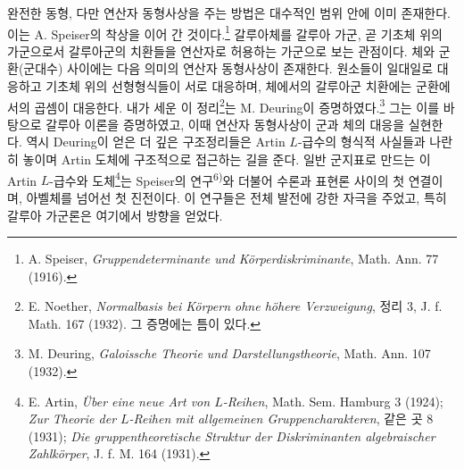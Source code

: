 완전한 동형, 다만 연산자 동형사상을 주는 방법은 대수적인 범위 안에 이미 존재한다. 이는 A. Speiser의 착상을 이어 간 것이다.\footnote{A. Speiser, \emph{Gruppendeterminante und Körperdiskriminante}, Math. Ann. 77 (1916).} 갈루아체를 \glqq{}갈루아 가군\grqq{}, 곧 기초체 위의 가군으로서 갈루아군의 치환들을 연산자로 허용하는 가군으로 보는 관점이다. 체와 군환(군대수) 사이에는 다음 의미의 연산자 동형사상이 존재한다. 원소들이 일대일로 대응하고 기초체 위의 선형형식들이 서로 대응하며, 체에서의 갈루아군 치환에는 군환에서의 곱셈이 대응한다. 내가 세운 이 정리\footnote{E. Noether, \emph{Normalbasis bei Körpern ohne höhere Verzweigung}, 정리 3, J. f. Math. 167 (1932). 그 증명에는 틈이 있다.}는 M. Deuring이 증명하였다.\footnote{M. Deuring, \emph{Galoissche Theorie und Darstellungstheorie}, Math. Ann. 107 (1932).} 그는 이를 바탕으로 갈루아 이론을 증명하였고, 이때 연산자 동형사상이 군과 체의 대응을 실현한다. 역시 Deuring이 얻은 더 깊은 구조정리들은 Artin \(L\)-급수의 형식적 사실들과 나란히 놓이며 Artin 도체에 구조적으로 접근하는 길을 준다. 일반 군지표로 만드는 이 Artin \(L\)-급수와 도체\footnote{E. Artin, \emph{Über eine neue Art von \(L\)-Reihen}, Math. Sem. Hamburg 3 (1924); \emph{Zur Theorie der \(L\)-Reihen mit allgemeinen Gruppencharakteren}, 같은 곳 8 (1931); \emph{Die gruppentheoretische Struktur der Diskriminanten algebraischer Zahlkörper}, J. f. M. 164 (1931).}는 Speiser의 연구\textsuperscript{6)}와 더불어 수론과 표현론 사이의 첫 연결이며, 아벨체를 넘어선 첫 진전이다. 이 연구들은 전체 발전에 강한 자극을 주었고, 특히 갈루아 가군론은 여기에서 방향을 얻었다.

